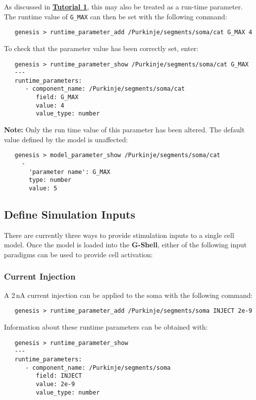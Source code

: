 \documentclass[12pt]{article}
\begin{document}
As discussed in \href{../tutorial1/tutorial1.tex}{\bf Tutorial 1}, this may also be treated as a run-time parameter.
The runtime value of {\tt G\_MAX} can then be set with the following command:
\begin{verbatim}
   genesis > runtime_parameter_add /Purkinje/segments/soma/cat G_MAX 4
\end{verbatim}
To check that the parameter value has been correctly set, enter:
\begin{verbatim}
   genesis > runtime_parameter_show /Purkinje/segments/soma/cat G_MAX
   ---
   runtime_parameters:
      - component_name: /Purkinje/segments/soma/cat
         field: G_MAX
         value: 4
         value_type: number
\end{verbatim}
{\bf Note:} Only the run time value of this parameter has been altered. The default value defined by the model is unaffected:
\begin{verbatim}
   genesis > model_parameter_show /Purkinje/segments/soma/cat
     -
       'parameter name': G_MAX
       type: number
       value: 5
\end{verbatim}

\subsection*{Define Simulation Inputs}

There are currently three ways to provide stimulation inputs to a single cell model. Once the model is loaded into the {\bf G-Shell}, either of the following input paradigms can be used to provide cell activation:

\subsubsection*{Current Injection}

A 2\,nA current injection can be applied to the soma with the following command:
\begin{verbatim}
   genesis > runtime_parameter_add /Purkinje/segments/soma INJECT 2e-9
\end{verbatim}

Information about these runtime parameters can be obtained with:
\begin{verbatim}
   genesis > runtime_parameter_show
   ---
   runtime_parameters:
      - component_name: /Purkinje/segments/soma
         field: INJECT
         value: 2e-9
         value_type: number
\end{verbatim}
\end{document}
